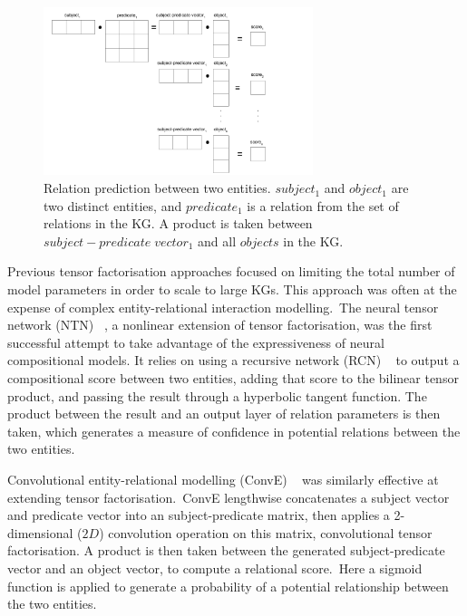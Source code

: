 \begin{figure}[H]
   	\centering
    	\includegraphics[width=0.7\textwidth, height=0.4\textwidth]{inference}
	\captionsetup{justification=centering}
	\caption{Relation prediction between two entities. $ subject_1 $ and $ object_1 $ are two distinct entities, and $ predicate_1 $ is a relation from the set of relations in the KG. A product is taken between $ subject-predicate \; vector_1 $ and all $ objects $ in the KG.}
\end{figure}

\noindent Previous tensor factorisation approaches focused on limiting the total number of model parameters in order to scale to large KGs. This approach was often at the expense of complex entity-relational interaction modelling.\ The neural tensor network (NTN) \unskip~\citep{socher2013reasoning}, a nonlinear extension of tensor factorisation, was the first successful attempt to take advantage of the expressiveness of neural compositional models. It relies on using a recursive network (RCN) \unskip ~\citep{pollack1990recursive} to output a compositional score between two entities, adding that score to the bilinear tensor product, and passing the result through a hyperbolic tangent function. The product between the result and an output layer of relation parameters is then taken, which generates a measure of confidence in potential relations between the two entities.\par

\noindent Convolutional entity-relational modelling (ConvE) \unskip~\citep{dettmers2018convolutional} was similarly effective at extending tensor factorisation.\ ConvE lengthwise concatenates a subject vector and predicate vector into an subject-predicate matrix, then applies a 2-dimensional ($ 2D $) convolution operation on this matrix, convolutional tensor factorisation. A product is then taken between the generated subject-predicate vector and an object vector, to compute a relational score.\ Here a sigmoid function is applied to generate a probability of a potential relationship between the two entities. \par 

